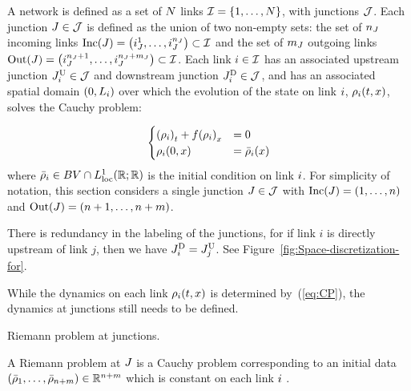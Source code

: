 A network
is defined as a set of $N$ links $\links=\intrange 1{\nlinks}$,
with junctions $\mathcal{J}$. Each junction $J\in\mathcal{J}$ is defined
as the union of  two non-empty sets: the set of $n_{J}$ incoming links $\Inc\left(\jn\right)=\tuple{\jlink{\jn}1}{\jlink{\jn}{\ninc_{\jn}}}\subset\links$
and the set of $m_{J}$ outgoing links $\Out\left(\jn\right)=\tuple{\jlink{\jn}{\ninc_{\jn}+1}}{\jlink{\jn}{\ninc_{\jn}+\nout_{\jn}}}\subset\links$.
Each link $i\in\mathcal{I}$ has an associated upstream junction $J_{i}^{\text{U}}\in\mathcal{J}$
and downstream junction $J_{i}^{\text{D}}\in\mathcal{J}$, and has an associated
spatial domain $\left(0,L_{\link}\right)$ over which the evolution
of the state on link $i$, $\cvar_{\link}\left(t,x\right)$, solves
the Cauchy problem:

\begin{equation}
\begin{cases}
\left(\cvar_{\link}\right)_{t}+f\left(\cvar_{\link}\right)_{x} & =0\\
\cvar_{\link}\left(0,x\right) & =\initstate_{\link}\left(x\right)
\end{cases}\label{eq:cauchy-i}
\end{equation}
where $\initstate_{\link}\in BV\cap L_{\text{loc}}^{1}\left(\mathbb{R};\mathbb{R}\right)$
is the initial condition on link $i$. For simplicity of notation,
this section considers a single junction $J\in\mathcal{J}$ with $\Inc\left(\jn\right)=\left(1,\ldots,\ninc\right)$
and $\Out\left(\jn\right)=\left(\ninc+1,\ldots,\ninc+\nout\right)$.
\begin{rem}
There is redundancy in the labeling of the junctions, for if link
$i$ is directly upstream of link $j$, then we have $J_{i}^{\text{D}}=J_{j}^{\text{U}}$.
See Figure~\ref{fig:Space-discretization-for}.
\end{rem}
While the dynamics on each link $\cvar_{\link}\left(t,x\right)$ is
determined by~(\ref{eq:CP}), the dynamics at junctions
still needs to be defined.
\begin{defn}
Riemann problem at junctions. 

A Riemann problem at $J$ is a Cauchy problem corresponding to an initial data $\tuple{\initstate_{1}}{\initstate_{\ninc+\nout}}\in\mathbb{R}^{\ninc+\nout}$ which is constant on each link $i$ .

\end{defn}
